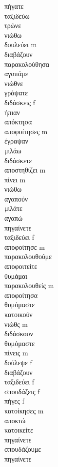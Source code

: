 πήγατε  \\ 
ταξιδεύω  \\ 
τρώνε  \\ 
νιώθω  \\ 
δουλεύει m \\ 
διαβάζουν  \\ 
παρακολούθησα  \\ 
αγαπάμε  \\ 
νιώθνε  \\ 
γράψατε  \\ 
διδάσκεις f \\ 
ήπιαν  \\ 
απόκτησα  \\ 
αποφοίτησες m \\ 
έγραψαν  \\ 
μιλάω  \\ 
διδάσκετε  \\ 
αποστηθίζει m \\ 
πίνει m \\ 
νιώθω  \\ 
αγαπούν  \\ 
μιλάτε  \\ 
αγαπώ  \\ 
πηγαίνετε  \\ 
ταξιδεύει f \\ 
αποφοίτησε m \\ 
παρακολουθούμε  \\ 
αποφοιτείτε  \\ 
θυμάμαι  \\ 
παρακολουθείς m \\ 
αποφοίτησα  \\ 
θυμόμαστε  \\ 
κατοικούν  \\ 
νιώθς m \\ 
διδάσκουν  \\ 
θυμόμαστε  \\ 
πίνεις m \\ 
δούλεψε f \\ 
διαβάζουν  \\ 
ταξιδεύει f \\ 
σπουδάζεις f \\ 
πήγες f \\ 
κατοίκησες m \\ 
αποκτώ  \\ 
κατοικείτε  \\ 
πηγαίνετε  \\ 
σπουδάζουμε  \\ 
πηγαίνετε  \\ 
